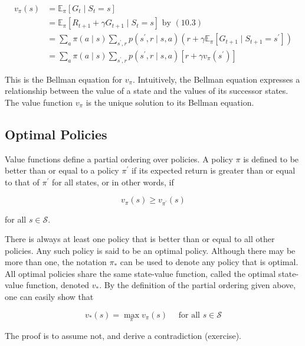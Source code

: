 \documentclass[11pt]{article}
\theoremstyle{plain} %
\theoremstyle{remark}
\begin{document}
$$
  \begin{aligned}
    v_{\pi}(s) & =\mathbb{E}_{\pi}\left[G_{t} \mid S_{t}=s\right]                                                                                                                     \\
               & =\mathbb{E}_{\pi}\left[R_{t+1}+\gamma G_{t+1} \mid S_{t}=s\right] \text { by }(10.3)                                                                                 \\
               & =\sum_{a} \pi(a \mid s) \sum_{s^{\prime}, r} p\left(s^{\prime}, r \mid s, a\right)\left(r+\gamma \mathbb{E}_{\pi}\left[G_{t+1} \mid S_{t+1}=s^{\prime}\right]\right) \\
               & =\sum_{a} \pi(a \mid s) \sum_{s^{\prime}, r} p\left(s^{\prime}, r \mid s, a\right)\left[r+\gamma v_{\pi}\left(s^{\prime}\right)\right]
  \end{aligned}
$$

This is the Bellman equation for $v_{\pi}$. Intuitively, the Bellman equation expresses a relationship between the
value of a state and the values of its successor states. The value function $v_{\pi}$ is the unique solution to its Bellman
equation.

\subsection{Optimal Policies}
Value functions define a partial ordering over policies. A policy $\pi$ is defined to be better than or equal to a policy
$\pi^{\prime}$ if its expected return is greater than or equal to that of
$\pi^{\prime}$ for all states, or in other words, if

$$
  v_{\pi}(s) \geq v_{\pi^{\prime}}(s)
$$

for all $s \in \mathcal{S}$.

There is always at least one policy that is better than or equal to all
other policies. Any such policy is said to be an optimal policy. Although there may be more than one, the notation $\pi_{*}$ can be used
to denote any policy that is optimal. {\color{C3}All optimal policies share the same state-value function, called the
    optimal state-value function}, denoted $v_{*}$. By the definition of the partial ordering given above, one can easily
show that

$$
  v_{*}(s)=\max _{\pi} v_{\pi}(s) \quad \text { for all } s \in \mathcal{S}
$$

The proof is to assume not, and derive a contradiction (exercise).
\end{document}
